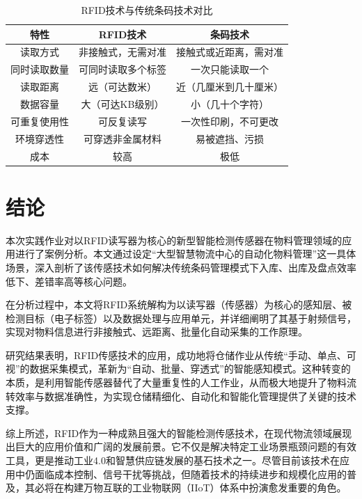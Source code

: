 \documentclass[a4paper, 12pt]{article}
\begin{document}
\begin{table}[H]
    \centering
    \setlength{\belowcaptionskip}{0.3cm} %
    \caption{RFID技术与传统条码技术对比}
    \label{tab:tech_comparison}
    \begin{tabular}{c c c}
        \toprule
        \textbf{特性} & \textbf{RFID技术} & \textbf{条码技术} \\
        \midrule
        读取方式 & 非接触式，无需对准 & 接触式或近距离，需对准 \\
        同时读取数量 & 可同时读取多个标签 & 一次只能读取一个 \\
        读取距离 & 远（可达数米） & 近（几厘米到几十厘米） \\
        数据容量 & 大（可达KB级别） & 小（几十个字符） \\
        可重复使用性 & 可反复读写 & 一次性印刷，不可更改 \\
        环境穿透性 & 可穿透非金属材料 & 易被遮挡、污损 \\
        成本 & 较高 & 极低 \\
        \bottomrule
    \end{tabular}
\end{table}

\section{结论}

本次实践作业对以RFID读写器为核心的新型智能检测传感器在物料管理领域的应用进行了案例分析。本文通过设定“大型智慧物流中心的自动化物料管理”这一具体场景，深入剖析了该传感技术如何解决传统条码管理模式下入库、出库及盘点效率低下、差错率高等核心问题。

在分析过程中，本文将RFID系统解构为以读写器（传感器）为核心的感知层、被检测目标（电子标签）以及数据处理与应用单元，并详细阐明了其基于射频信号，实现对物料信息进行非接触式、远距离、批量化自动采集的工作原理。

研究结果表明，RFID传感技术的应用，成功地将仓储作业从传统“手动、单点、可视”的数据采集模式，革新为“自动、批量、穿透式”的智能感知模式。这种转变的本质，是利用智能传感器替代了大量重复性的人工作业，从而极大地提升了物料流转效率与数据准确性，为实现仓储精细化、自动化和智能化管理提供了关键的技术支撑。

综上所述，RFID作为一种成熟且强大的智能检测传感技术，在现代物流领域展现出巨大的应用价值和广阔的发展前景。它不仅是解决特定工业场景瓶颈问题的有效工具，更是推动工业4.0和智慧供应链发展的基石技术之一。尽管目前该技术在应用中仍面临成本控制、信号干扰等挑战，但随着技术的持续进步和规模化应用的普及，其必将在构建万物互联的工业物联网（IIoT）体系中扮演愈发重要的角色。
\end{document}
